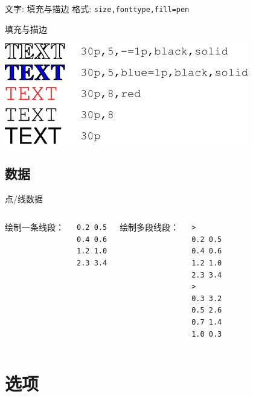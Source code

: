 \documentclass[UTF8, 11pt]{ctexbeamer}
\begin{document}
\begin{frame}[fragile]{文字: 填充与描边}
格式: \verb|size,fonttype,fill=pen| \\
\begin{block}{填充与描边}
\begin{center}
\includegraphics[width=0.8\textwidth]{GMT_text_examples}
\end{center}
\end{block}
\end{frame}

\subsection{数据}
\begin{frame}[fragile]{点/线数据}
\begin{columns}
绘制一条线段：
\begin{verbatim}
0.2 0.5
0.4 0.6
1.2 1.0
2.3 3.4
\end{verbatim}
绘制多段线段：
\begin{verbatim}
>
0.2 0.5
0.4 0.6
1.2 1.0
2.3 3.4
>
0.3 3.2
0.5 2.6
0.7 1.4
1.0 0.3
\end{verbatim}
\end{columns}
\end{frame}

\section{选项}
\end{document}
